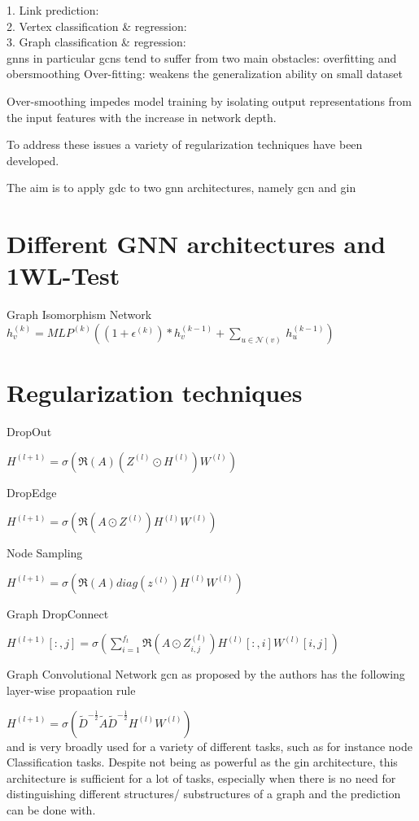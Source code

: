 1. Link prediction:\\
2. Vertex classification \& regression:\\
3. Graph classification \& regression:\\


\acp{gnn} in particular \acp{gcn} tend to suffer from two main obstacles:
overfitting and obersmoothing
Over-fitting: weakens the generalization ability on small dataset

Over-smoothing impedes model training by isolating output representations from the input features with the increase in network depth.

To address these issues a variety of regularization techniques have been developed.


The aim is to apply \ac{gdc} to two \ac{gnn} architectures, namely \ac{gcn} and
\ac{gin}


\section{Different GNN architectures and 1WL-Test}
\label{sec:related:sec2}

Graph Isomorphism Network
$h^{(k)}_{v} = MLP^{(k)} ((1 + \epsilon^{(k)}) *h^{(k-1)}_{v} + \sum_{{u} \in{\mathcal{N}(v)}} \,h^{(k-1)}_{u})$



\section{Regularization techniques}
\label{sec:related:sec3}
DropOut

$H^{(l+1)} = \sigma(\mathfrak{R}(A)(Z^{(l)}\odot H^{(l)}) W^{(l)})$


DropEdge

$H^{(l+1)} = \sigma(\mathfrak{R}(A \odot Z^{(l)}) H^{(l)} W^{(l)})$


Node Sampling

$H^{(l+1)} = \sigma (\mathfrak{R}(A) diag(z^{(l)}) H^{(l)} W^{(l)})$


Graph DropConnect


$H^{(l+1)}[:,j] = \sigma (\sum_{i=1}^{f_{t}}\mathfrak{R}(A \odot Z_{i,j}^{(l)})H^{(l)}[:,i]W^{(l)}[i,j])$

Graph Convolutional Network \ac{gcn} as proposed by the authors \cite{Kipf2017} has the
following layer-wise propaation rule

$H^{(l+1)} = \sigma (\tilde{D}^{-\frac{1}{2}}\tilde{A}\tilde{D}^{-\frac{1}{2}} H^{(l)}W^{(l)})$\\
and is very broadly used for a variety of different tasks, such as for instance node Classification tasks.
Despite not being as powerful as the \ac{gin} architecture, this architecture is sufficient for a lot
of tasks, especially when there is no need for distinguishing different structures/ substructures
of a graph and the prediction can be done with.

